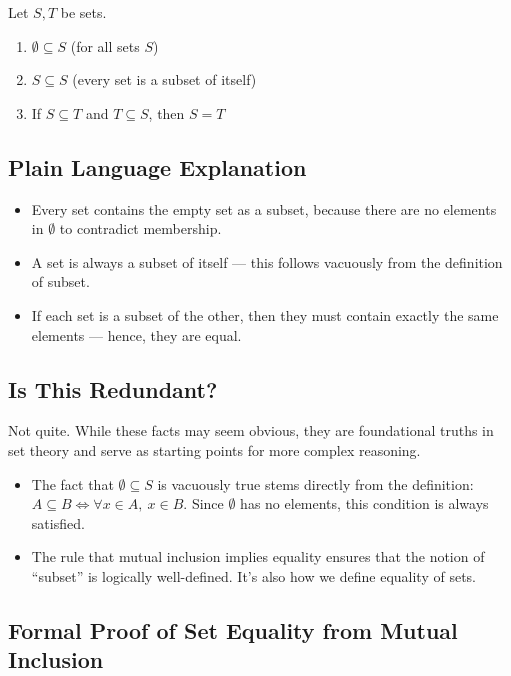 \documentclass[10pt]{article}
\theoremstyle{plain}
\theoremstyle{definition}
\begin{document}
	Let \( S, T \) be sets.
	
	\begin{enumerate}
		\item \( \emptyset \subseteq S \) \hfill (for all sets \( S \))
		\item \( S \subseteq S \) \hfill (every set is a subset of itself)
		\item If \( S \subseteq T \) and \( T \subseteq S \), then \( S = T \)
	\end{enumerate}
	
	\subsection*{Plain Language Explanation}
	
	\begin{itemize}
		\item Every set contains the empty set as a subset, because there are no elements in \( \emptyset \) to contradict membership.
		\item A set is always a subset of itself — this follows vacuously from the definition of subset.
		\item If each set is a subset of the other, then they must contain exactly the same elements — hence, they are equal.
	\end{itemize}
	
	\subsection*{Is This Redundant?}
	
	Not quite. While these facts may seem obvious, they are foundational truths in set theory and serve as starting points for more complex reasoning.
	
	\begin{itemize}
		\item The fact that \( \emptyset \subseteq S \) is vacuously true stems directly from the definition:  
		\( A \subseteq B \iff \forall x \in A,\ x \in B \). Since \( \emptyset \) has no elements, this condition is always satisfied.
		
		\item The rule that mutual inclusion implies equality ensures that the notion of ``subset'' is logically well-defined. It's also how we define equality of sets.
	\end{itemize}
	
	\subsection*{Formal Proof of Set Equality from Mutual Inclusion}
	
\end{document}
